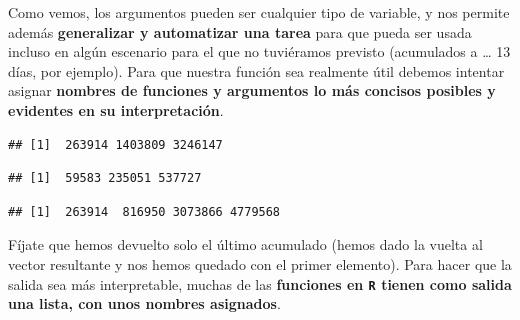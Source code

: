 \documentclass[11pt,]{book}
\newenvironment{Shaded}{\begin{snugshade}}{\end{snugshade}}
\newcommand{\DataTypeTok}[1]{\textcolor[rgb]{0.27,0.27,0.27}{#1}}
\newcommand{\DecValTok}[1]{\textcolor[rgb]{0.06,0.06,0.06}{#1}}
\newcommand{\KeywordTok}[1]{\textcolor[rgb]{0.27,0.27,0.27}{\textbf{#1}}}
\newcommand{\NormalTok}[1]{#1}
\newcommand{\OperatorTok}[1]{\textcolor[rgb]{0.43,0.43,0.43}{\textbf{#1}}}
\begin{document}
Como vemos, los argumentos pueden ser cualquier tipo de variable, y nos permite además \textbf{generalizar y automatizar una tarea} para que pueda ser usada incluso en algún escenario para el que no tuviéramos previsto (acumulados a \ldots{} 13 días, por ejemplo). Para que nuestra función sea realmente útil debemos intentar asignar \textbf{nombres de funciones y argumentos lo más concisos posibles y evidentes en su interpretación}.

\begin{Shaded}
\end{Shaded}

\begin{verbatim}
## [1]  263914 1403809 3246147
\end{verbatim}

\begin{Shaded}
\end{Shaded}

\begin{verbatim}
## [1]  59583 235051 537727
\end{verbatim}

\begin{Shaded}
\end{Shaded}

\begin{verbatim}
## [1]  263914  816950 3073866 4779568
\end{verbatim}

Fíjate que hemos devuelto solo el último acumulado (hemos dado la vuelta al vector resultante y nos hemos quedado con el primer elemento). Para hacer que la salida sea más interpretable, muchas de las \textbf{funciones en \texttt{R} tienen como salida una lista, con unos nombres asignados}.
\end{document}
